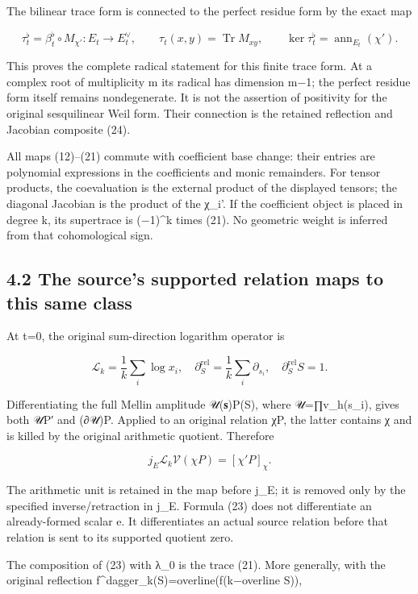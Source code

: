 \documentclass[
  11pt,
]{article}
\begin{document}
The bilinear trace form is connected to the perfect residue form by the
exact map

\[
\tau_t^\flat=\beta_t^\flat\circ M_{\chi'}:E_t\longrightarrow E_t^\vee,
\qquad \tau_t(x,y)=\operatorname{Tr}M_{xy},
\qquad \ker\tau_t^\flat=\operatorname{ann}_{E_t}(\chi').
\tag{21a}
\]

This proves the complete radical statement for this finite trace form.
At a complex root of multiplicity m its radical has dimension m−1; the
perfect residue form itself remains nondegenerate. It is not the
assertion of positivity for the original sesquilinear Weil form. Their
connection is the retained reflection and Jacobian composite (24).

All maps (12)--(21) commute with coefficient base change: their entries
are polynomial expressions in the coefficients and monic remainders. For
tensor products, the coevaluation is the external product of the
displayed tensors; the diagonal Jacobian is the product of the χ\_i'. If
the coefficient object is placed in degree k, its supertrace is
(−1)\^{}k times (21). No geometric weight is inferred from that
cohomological sign.

\subsection{4.2 The source's supported relation maps to this same
class}\label{the-sources-supported-relation-maps-to-this-same-class}

At t=0, the original sum-direction logarithm operator is

\[
\mathscr L_k=\frac1k\sum_i\log x_i,
\quad
\partial_S^{\mathrm{rel}}=\frac1k\sum_i\partial_{s_i},
\quad\partial_S^{\mathrm{rel}}S=1.
\tag{22}
\]

Differentiating the full Mellin amplitude 𝒰(𝐬)P(S), where 𝒰=∏v\_h(s\_i),
gives both 𝒰P′ and (∂𝒰)P. Applied to an original relation χP, the latter
contains χ and is killed by the original arithmetic quotient. Therefore

\[
\boxed{j_E\mathscr L_k\mathcal V(\chi P)=[\chi'P]_\chi.}
\tag{23}
\]

The arithmetic unit is retained in the map before j\_E; it is removed
only by the specified inverse/retraction in j\_E. Formula (23) does not
differentiate an already-formed scalar e. It differentiates an actual
source relation before that relation is sent to its supported quotient
zero.

The composition of (23) with λ\_0 is the trace (21). More generally,
with the original reflection f\^{}dagger\_k(S)=overline(f(k−overline
S)),
\end{document}
